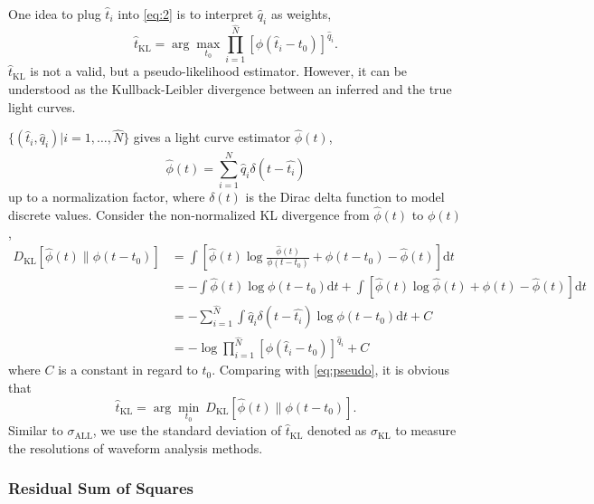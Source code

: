 One idea to plug $\hat{t}_i$ into \eqref{eq:2} is to interpret $\hat{q}_i$ as weights,
\begin{equation}
  \label{eq:pseudo}
  \hat{t}_\mathrm{KL} = \arg\underset{t_0}{\max} \prod_{i=1}^{\hat{N}} \left[\phi(\hat{t}_i-t_0)\right]^{\hat{q}_i}.
\end{equation}
$\hat{t}_\mathrm{KL}$ is not a valid, but a pseudo-likelihood estimator. However, it can be understood as the Kullback-Leibler divergence between an inferred and the true light curves.

$\{(\hat{t}_i, \hat{q}_i)|i=1,\ldots,\hat{N}\}$ gives a light curve estimator $\hat{\phi}(t)$,
\begin{equation}
  \label{eq:lc}
  \hat{\phi}(t) = \sum_{i=1}^{\hat{N}} \hat{q}_i\delta(t-\hat{t_i})
\end{equation}
up to a normalization factor, where $\delta(t)$ is the Dirac delta function to model discrete values.  Consider the non-normalized KL divergence from $\hat{\phi}(t)$ to $\phi(t)$,
\begin{equation}
  \begin{aligned}
    D_\mathrm{KL}\left[\hat{\phi}(t) \parallel \phi(t-t_0)\right] & =\int \left[\hat{\phi}(t) \log\frac{\hat{\phi}(t)}{\phi(t-t_0)} + \phi(t-t_0) - \hat{\phi}(t) \right]\mathrm{d}t \\
    & = - \int \hat{\phi}(t) \log\phi(t-t_0)\mathrm{d}t + \int \left[\hat{\phi}(t) \log\hat{\phi}(t) + \phi(t) - \hat{\phi}(t) \right]\mathrm{d}t \\
    & = - \sum_{i=1}^{\hat{N}}\int \hat{q}_i\delta(t-\hat{t_i}) \log\phi(t-t_0)\mathrm{d}t + C \\
    & = -\log \prod_{i=1}^{\hat{N}} \left[\phi(\hat{t}_i-t_0)\right]^{\hat{q}_i} + C
  \label{eq:kl}
  \end{aligned}
\end{equation}
where $C$ is a constant in regard to $t_0$.  Comparing with \eqref{eq:pseudo}, it is obvious that
\begin{equation}
  \label{eq:kl2}
  \hat{t}_\mathrm{KL} = \arg\underset{t_0}{\min}~D_\mathrm{KL}\left[\hat{\phi}(t) \parallel \phi(t-t_0)\right].
\end{equation}
Similar to $\sigma_\mathrm{ALL}$, we use the standard deviation of $\hat{t}_\mathrm{KL}$ denoted as $\sigma_\mathrm{KL}$ to measure the resolutions of waveform analysis methods.

\subsubsection{Residual Sum of Squares}
\label{sec:rss}


